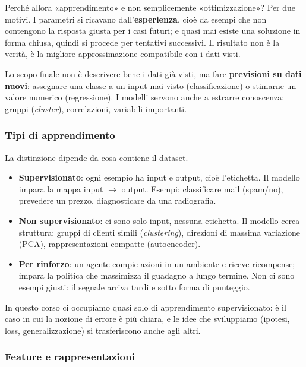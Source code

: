 \documentclass[12pt]{extarticle}
\begin{document}
\noindent Perché allora «apprendimento» e non semplicemente «ottimizzazione»? Per due motivi. I parametri si ricavano dall'\textbf{esperienza}, cioè da esempi che non contengono la risposta giusta per i casi futuri; e quasi mai esiste una soluzione in forma chiusa, quindi si procede per tentativi successivi. Il risultato non è la verità, è la migliore approssimazione compatibile con i dati visti.

\noindent Lo scopo finale non è descrivere bene i dati già visti, ma fare \textbf{previsioni su dati nuovi}: assegnare una classe a un input mai visto (classificazione) o stimarne un valore numerico (regressione). I modelli servono anche a estrarre conoscenza: gruppi (\emph{cluster}), correlazioni, variabili importanti.

\subsubsection{Tipi di apprendimento}

\noindent La distinzione dipende da cosa contiene il dataset.

\begin{itemize}
    \item \textbf{Supervisionato}: ogni esempio ha input e output, cioè l'etichetta. Il modello impara la mappa input $\to$ output. Esempi: classificare mail (spam/no), prevedere un prezzo, diagnosticare da una radiografia.
    \item \textbf{Non supervisionato}: ci sono solo input, nessuna etichetta. Il modello cerca struttura: gruppi di clienti simili (\emph{clustering}), direzioni di massima variazione (PCA), rappresentazioni compatte (autoencoder).
    \item \textbf{Per rinforzo}: un agente compie azioni in un ambiente e riceve ricompense; impara la politica che massimizza il guadagno a lungo termine. Non ci sono esempi giusti: il segnale arriva tardi e sotto forma di punteggio.
\end{itemize}

\noindent In questo corso ci occupiamo quasi solo di apprendimento supervisionato: è il caso in cui la nozione di errore è più chiara, e le idee che sviluppiamo (ipotesi, loss, generalizzazione) si trasferiscono anche agli altri.

\subsubsection{Feature e rappresentazioni}
\end{document}
